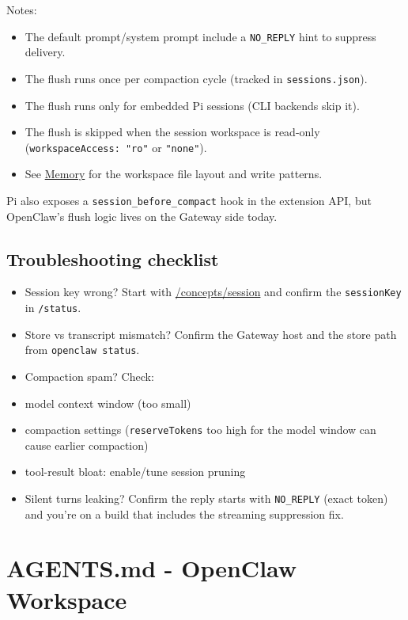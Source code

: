 Notes:

\begin{itemize}
  \item The default prompt/system prompt include a \texttt{NO\_REPLY} hint to suppress delivery.
  \item The flush runs once per compaction cycle (tracked in \texttt{sessions.json}).
  \item The flush runs only for embedded Pi sessions (CLI backends skip it).
  \item The flush is skipped when the session workspace is read-only (\texttt{workspaceAccess: "ro"} or \texttt{"none"}).
  \item See \href{/concepts/memory}{Memory} for the workspace file layout and write patterns.
\end{itemize}


Pi also exposes a \texttt{session\_before\_compact} hook in the extension API, but OpenClaw’s
flush logic lives on the Gateway side today.

\hrulefill


\subsection{Troubleshooting checklist}


\begin{itemize}
  \item Session key wrong? Start with \href{/concepts/session}{/concepts/session} and confirm the \texttt{sessionKey} in \texttt{/status}.
  \item Store vs transcript mismatch? Confirm the Gateway host and the store path from \texttt{openclaw status}.
  \item Compaction spam? Check:
  \item model context window (too small)
  \item compaction settings (\texttt{reserveTokens} too high for the model window can cause earlier compaction)
  \item tool-result bloat: enable/tune session pruning
  \item Silent turns leaking? Confirm the reply starts with \texttt{NO\_REPLY} (exact token) and you’re on a build that includes the streaming suppression fix.
\end{itemize}



\clearpage

\section{AGENTS.md - OpenClaw Workspace}


